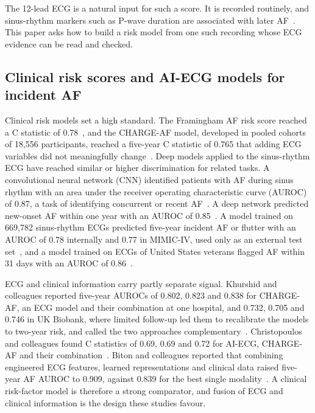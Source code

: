 \documentclass[preprint,12pt]{elsarticle}
\begin{document}
The 12-lead ECG is a natural input for such a score. It is recorded routinely, and sinus-rhythm markers such as P-wave duration are associated with later AF~\cite{nielsen2015}. This paper asks how to build a risk model from one such recording whose ECG evidence can be read and checked.

\subsection{Clinical risk scores and AI-ECG models for incident AF}

Clinical risk models set a high standard. The Framingham AF risk score reached a C statistic of 0.78~\cite{schnabel2009}, and the CHARGE-AF model, developed in pooled cohorts of 18,556 participants, reached a five-year C statistic of 0.765 that adding ECG variables did not meaningfully change~\cite{alonso2013}. Deep models applied to the sinus-rhythm ECG have reached similar or higher discrimination for related tasks. A convolutional neural network (CNN) identified patients with AF during sinus rhythm with an area under the receiver operating characteristic curve (AUROC) of 0.87, a task of identifying concurrent or recent AF~\cite{attia2019}. A deep network predicted new-onset AF within one year with an AUROC of 0.85~\cite{raghunath2021}. A model trained on 669,782 sinus-rhythm ECGs predicted five-year incident AF or flutter with an AUROC of 0.78 internally and 0.77 in MIMIC-IV, used only as an external test set~\cite{jabbour2024}, and a model trained on ECGs of United States veterans flagged AF within 31 days with an AUROC of 0.86~\cite{yuan2023}.

ECG and clinical information carry partly separate signal. Khurshid and colleagues reported five-year AUROCs of 0.802, 0.823 and 0.838 for CHARGE-AF, an ECG model and their combination at one hospital, and 0.732, 0.705 and 0.746 in UK Biobank, where limited follow-up led them to recalibrate the models to two-year risk, and called the two approaches complementary~\cite{khurshid2022}. Christopoulos and colleagues found C statistics of 0.69, 0.69 and 0.72 for AI-ECG, CHARGE-AF and their combination~\cite{christopoulos2020}. Biton and colleagues reported that combining engineered ECG features, learned representations and clinical data raised five-year AF AUROC to 0.909, against 0.839 for the best single modality~\cite{biton2021}. A clinical risk-factor model is therefore a strong comparator, and fusion of ECG and clinical information is the design these studies favour.
\end{document}
